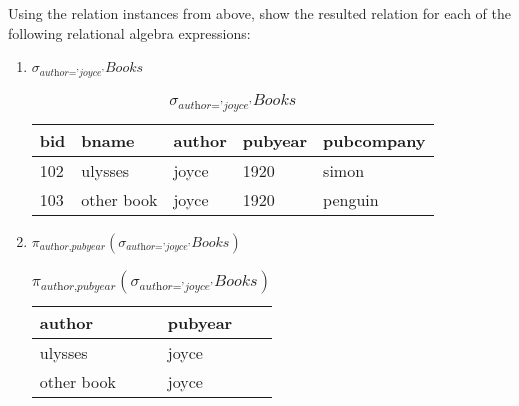 \documentclass[letterpaper, 11pt]{article}
\begin{document}
Using the relation instances from above, show the resulted relation for each of the following relational algebra expressions:
\begin{enumerate}[label={\alph*})]
    \item $\sigma_{\textit{author='joyce'}}\textit{Books}$
    \begin{table}[H]
        \centering
        \caption*{$\sigma_{\textit{author='joyce'}}\textit{Books}$}
        \begin{tabular}{|l|l|l|l|l|}
        \hline
            \cellcolor[HTML]{b4c6e7} bid & \cellcolor[HTML]{b4c6e7} bname & \cellcolor[HTML]{b4c6e7} author & \cellcolor[HTML]{b4c6e7} pubyear & \cellcolor[HTML]{b4c6e7} pubcompany \\
            \hline
            102 & ulysses & joyce & 1920 & simon \\
            \hline
            103 & other book & joyce & 1920 & penguin \\
            \hline
        \end{tabular}
    \end{table}
    
    \item $\pi_{\textit{author,pubyear}}(\sigma_{\textit{author='joyce'}}\textit{Books})$
    \begin{table}[H]
        \centering
        \caption*{$\pi_{\textit{author,pubyear}}(\sigma_{\textit{author='joyce'}}\textit{Books})$}
        \begin{tabular}{|l|l|}
        \hline
            \cellcolor[HTML]{b4c6e7} author & \cellcolor[HTML]{b4c6e7} pubyear \\
            \hline
            ulysses & joyce \\
            \hline
            other book & joyce \\
            \hline
        \end{tabular}
    \end{table}
    

\end{enumerate}
\end{document}
